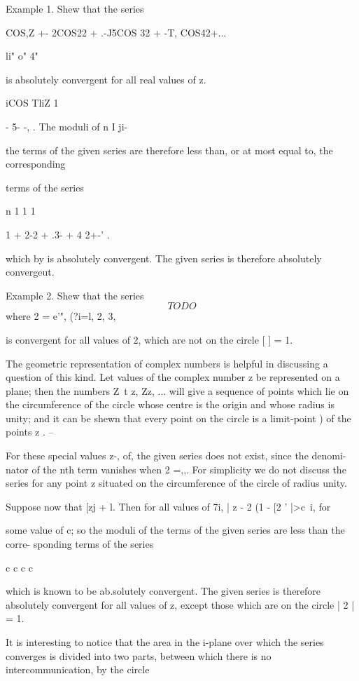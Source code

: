 Example 1. Shew that the series

COS,Z +- 2COS22 + .-J5COS 32 + -T, COS42+...

li" o" 4"

is absolutely convergent for all real values of z.

iCOS TliZ 1

- 5- -, . The moduli of n I ji-

the terms of the given series are therefore less than, or at most
equal to, the corresponding

terms of the series

n 1 1 1

1 + 2-2 + .3- + 4 2+-' .

which by  is absolutely convergent. The given series is
therefore absolutely convergeut.

Example 2. Shew that the series
$$
TODO
$$
where 2 = e'", (?i=l, 2, 3,

is convergent for all values of 2, which are not on the circle [ ] =
1.

%
%

The geometric representation of complex numbers is helpful in
discussing a question of this kind. Let values of the complex number z
be represented on a plane; then the numbers Z\ t z, Zz, ... will
give a sequence of points which lie on the circumference of the circle
whose centre is the origin and whose radius is unity; and it can be
shewn that every point on the circle is a limit-point ) of the
points z . --

For these special values z-, of, the given series does not exist,
since the denomi- nator of the nth term vanishes when 2 =,,. For
simplicity we do not discuss the series for any point z situated on
the circumference of the circle of radius unity.

Suppose now that [zj + l. Then for all values of 7i, | z - 2 (1 - [2 '
|>c~i, for

some value of c; so the moduli of the terms of the given series are
less than the corre- sponding terms of the series

c c c c

which is known to be ab.solutely convergent. The given series is
therefore absolutely convergent for all values of z, except those
which are on the circle | 2 | = 1.

It is interesting to notice that the area in the i-plane over which
the series converges is divided into two parts, between which there is
no intercommunication, by the circle

